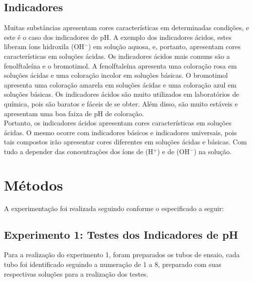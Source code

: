    \subsection{Indicadores}\label{subsubsec:mat_materiais_indicadores}
    \indent Muitas substâncias apresentam cores características em determinadas condições, e este é o caso dos indicadores de pH. A exemplo dos indicadores ácidos, estes liberam íons hidroxila (OH$^-$) em solução aquosa, e, portanto, apresentam cores características em soluções ácidas.
    Os indicadores ácidos mais comuns são a fenolftaleína e o bromotimol.
    A fenolftaleína apresenta uma coloração rosa em soluções ácidas e uma coloração incolor em soluções básicas.
    O bromotimol apresenta uma coloração amarela em soluções ácidas e uma coloração azul em soluções básicas.
    Os indicadores ácidos são muito utilizados em laboratórios de química, pois são baratos e fáceis de se obter.
    Além disso, são muito estáveis e apresentam uma boa faixa de pH de coloração.\\
    Portanto, os indicadores ácidos apresentam cores características em soluções ácidas.
    O mesmo ocorre com indicadores básicos e indicadores universais, pois tais compostos irão apresentar cores diferentes em soluções ácidas e básicas.
    Com tudo a depender das concentrações dos íons de (H$^+$) e de (OH$^-$) na solução.

    \section{Métodos}\label{subsec:mat_metodos}
        \indent A experimentação foi realizada seguindo conforme o especificado a seguir:

    \subsection{Experimento 1: Testes dos Indicadores de pH}\label{subsubsec:mat_metodos_exp1}
        \indent Para a realização do experimento 1, foram preparados os tubos de ensaio, cada tubo foi identificado seguindo a numeração de 1 a 8, preparado com suas respectivas soluções para a realização dos testes.\\

